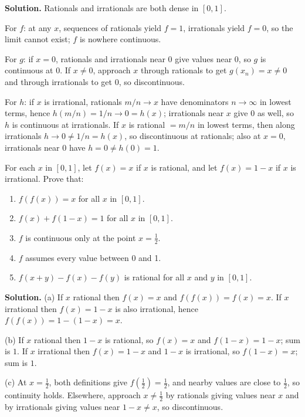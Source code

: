 \noindent\textbf{Solution.}
Rationals and irrationals are both dense in $[0,1]$.

For $f$: at any $x$, sequences of rationals yield $f=1$, irrationals yield $f=0$, so the limit cannot exist; $f$ is nowhere continuous.

For $g$: if $x=0$, rationals and irrationals near $0$ give values near $0$, so $g$ is continuous at $0$. If $x\ne0$, approach $x$ through rationals to get $g(x_n)=x\ne 0$ and through irrationals to get $0$, so discontinuous.

For $h$: if $x$ is irrational, rationals $m/n\to x$ have denominators $n\to\infty$ in lowest terms, hence $h(m/n)=1/n\to 0=h(x)$; irrationals near $x$ give $0$ as well, so $h$ is continuous at irrationals. If $x$ is rational $=m/n$ in lowest terms, then along irrationals $h\to 0\ne 1/n=h(x)$, so discontinuous at rationals; also at $x=0$, irrationals near $0$ have $h=0\ne h(0)=1$.
\medskip

\begin{problembox}
For each \( x \) in \([0, 1]\), let \( f(x) = x \) if \( x \) is rational, and let \( f(x) = 1 - x \) if \( x \) is irrational. Prove that:
\begin{enumerate}[label=(\alph*)]
\item \( f(f(x)) = x \) for all \( x \) in \([0, 1]\).
\item \( f(x) + f(1 - x) = 1 \) for all \( x \) in \([0, 1]\).
\item \( f \) is continuous only at the point \( x = \frac{1}{2} \).
\item \( f \) assumes every value between 0 and 1.
\item \( f(x + y) - f(x) - f(y) \) is rational for all \( x \) and \( y \) in \([0, 1]\).
\end{enumerate}
\end{problembox}

\noindent\textbf{Solution.}
(a) If $x$ rational then $f(x)=x$ and $f(f(x))=f(x)=x$. If $x$ irrational then $f(x)=1-x$ is also irrational, hence $f(f(x))=1-(1-x)=x$.

(b) If $x$ rational then $1-x$ is rational, so $f(x)=x$ and $f(1-x)=1-x$; sum is $1$. If $x$ irrational then $f(x)=1-x$ and $1-x$ is irrational, so $f(1-x)=x$; sum is $1$.

(c) At $x=\tfrac12$, both definitions give $f(\tfrac12)=\tfrac12$, and nearby values are close to $\tfrac12$, so continuity holds. Elsewhere, approach $x\ne\tfrac12$ by rationals giving values near $x$ and by irrationals giving values near $1-x\ne x$, so discontinuous.

